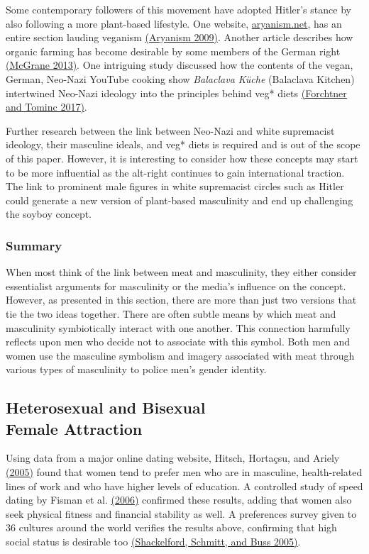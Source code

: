 \documentclass[twoside]{report}
\begin{document}
Some contemporary followers of this movement have adopted Hitler's
stance by also following a more plant-based lifestyle. One website,
\href{https://www.aryanism.net}{aryanism.net}, has an entire section lauding veganism \hyperlink{aryanism}{(Aryanism 2009)}. Another article describes how organic farming has become desirable by some members of the German right \hyperlink{mcgrane}{(McGrane 2013)}. One intriguing study discussed how the contents of the vegan, German, Neo-Nazi YouTube cooking show \textit{Balaclava Küche} (Balaclava Kitchen) intertwined Neo-Nazi ideology into the principles behind veg* diets \hyperlink{forchtner}{(Forchtner and Tominc 2017)}.

Further research between the link between Neo-Nazi and white supremacist
ideology, their masculine ideals, and veg* diets is required and is out
of the scope of this paper. However, it is interesting to consider how
these concepts may start to be more influential as the alt-right
continues to gain international traction. The link to prominent male
figures in white supremacist circles such as Hitler could generate a new
version of plant-based masculinity and end up challenging the
soyboy concept.

\subsubsection{Summary}

When most think of the link between meat and masculinity, they either
consider essentialist arguments for masculinity or the media's influence
on the concept. However, as presented in this section, there are more
than just two versions that tie the two ideas together. There are often subtle means by which meat and masculinity symbiotically interact with one another. This connection harmfully reflects upon men who decide not to associate with this symbol. Both men and women use the masculine symbolism and imagery associated with meat through various types of masculinity to police men's gender identity.

\subsection[Heterosexual and Bisexual Female Attraction]{Heterosexual and Bisexual\\ Female Attraction}

Using data from a major online dating website, Hitsch, Hortaçsu, and
Ariely \hyperlink{hitsch1}{(2005)} found that women tend to prefer men who are in masculine, health-related lines of work and who have higher levels of education. A controlled study of speed dating by Fisman
et al. \hyperlink{fisman}{(2006)} confirmed these results, adding that women also seek physical fitness and financial stability as well. A preferences survey given to 36 cultures around the world verifies the results above, confirming that high social status is desirable too \hyperlink{shackelford}{(Shackelford, Schmitt, and Buss 2005)}.
\end{document}

